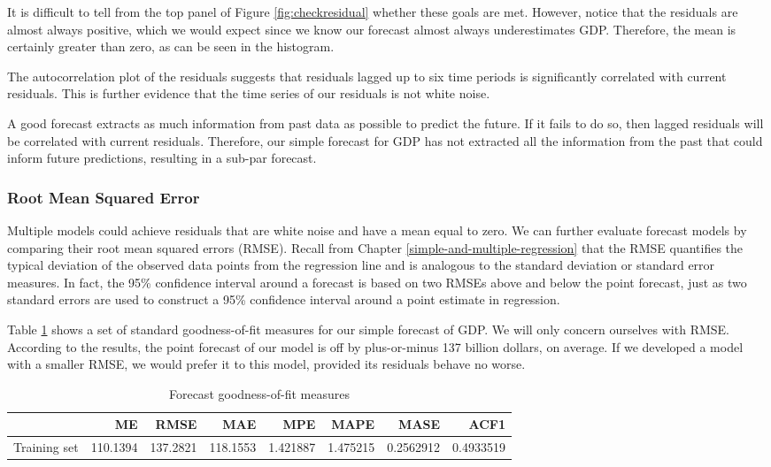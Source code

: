 \documentclass[
]{book}
\begin{document}
It is difficult to tell from the top panel of Figure \ref{fig:checkresidual} whether these goals are met. However, notice that the residuals are almost always positive, which we would expect since we know our forecast almost always underestimates GDP. Therefore, the mean is certainly greater than zero, as can be seen in the histogram.

The autocorrelation plot of the residuals suggests that residuals lagged up to six time periods is significantly correlated with current residuals. This is further evidence that the time series of our residuals is not white noise.

A good forecast extracts as much information from past data as possible to predict the future. If it fails to do so, then lagged residuals will be correlated with current residuals. Therefore, our simple forecast for GDP has not extracted all the information from the past that could inform future predictions, resulting in a sub-par forecast.

\hypertarget{root-mean-squared-error}{%
\subsubsection*{Root Mean Squared Error}\label{root-mean-squared-error}}

Multiple models could achieve residuals that are white noise and have a mean equal to zero. We can further evaluate forecast models by comparing their root mean squared errors (RMSE). Recall from Chapter \ref{simple-and-multiple-regression} that the RMSE quantifies the typical deviation of the observed data points from the regression line and is analogous to the standard deviation or standard error measures. In fact, the 95\% confidence interval around a forecast is based on two RMSEs above and below the point forecast, just as two standard errors are used to construct a 95\% confidence interval around a point estimate in regression.

Table \ref{tab:frmse} shows a set of standard goodness-of-fit measures for our simple forecast of GDP. We will only concern ourselves with RMSE. According to the results, the point forecast of our model is off by plus-or-minus 137 billion dollars, on average. If we developed a model with a smaller RMSE, we would prefer it to this model, provided its residuals behave no worse.

\begin{table}

\caption{\label{tab:frmse}Forecast goodness-of-fit measures}
\centering
\begin{tabular}[t]{l|r|r|r|r|r|r|r}
\hline
  & ME & RMSE & MAE & MPE & MAPE & MASE & ACF1\\
\hline
Training set & 110.1394 & 137.2821 & 118.1553 & 1.421887 & 1.475215 & 0.2562912 & 0.4933519\\
\hline
\end{tabular}
\end{table}
\end{document}
